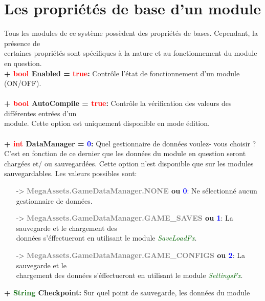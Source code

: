 \documentclass[a4paper, 11pt]{article}
\begin{document}
	\newpage \section{Les propriétés de base d'un module}
	Tous les modules de ce système possèdent des propriétés de bases. Cependant, la présence de \\certaines 
	propriétés sont spécifiques à la nature et au fonctionnement du module en question.\\
	\textbf{+ \textcolor{red}{bool} Enabled = \textcolor{red}{true}:} Contrôle l'état de fonctionnement d'un 
	module (ON/OFF).\\\\
	\textbf{+ \textcolor{red}{bool} AutoCompile = \textcolor{red}{true}:} Contrôle la vérification des 
	valeurs des différentes entrées d'un \\module. Cette option est uniquement disponible en mode édition.
	\\\\
	\textbf{+ \textcolor{red}{int} DataManager = \textcolor{blue}{0}:} Quel gestionnaire de données voulez-
	vous choisir ? C'est en fonction de ce dernier que les données du module en question seront chargées et/
	ou sauvegardées. Cette option n'est disponible que sur les modules sauvegardables. Les valeurs possibles
	sont:
	\begin{itemize}
		\item [-> \textbf{\textcolor{gray}{MegaAssets.GameDataManager.NONE} ou \textcolor{blue}{0}}:] Ne
		sélectionné aucun gestionnaire de données.
		\item [-> \textbf{\textcolor{gray}{MegaAssets.GameDataManager.GAME\_SAVES} ou \textcolor{blue}{1}}:]
		La sauvegarde et le chargement des \\données s'éffectueront en utilisant le module
		\textit{\textcolor{darkgreen}{SaveLoadFx}}.
		\item [-> \textbf{\textcolor{gray}{MegaAssets.GameDataManager.GAME\_CONFIGS} ou \textcolor{blue}
		{2}}:] La sauvegarde et le \\chargement des données s'éffectueront en utilisant le module
		\textit{\textcolor{darkgreen}{SettingsFx}}.\\
	\end{itemize}
	\textbf{+ \textcolor{darkgreen}{String} Checkpoint:} Sur quel point de sauvegarde, les données du module
\end{document}
